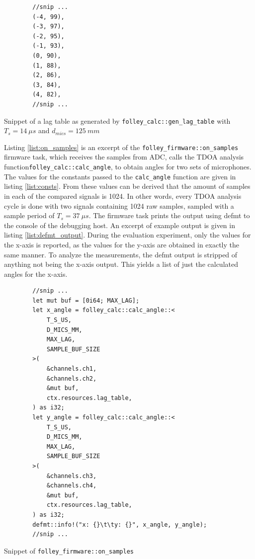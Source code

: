 \documentclass[a4paper]{article}
\newcommand{\rust}[1]{\texttt{#1}}
\begin{document}
\begin{listing}[H]
    \begin{verbatim}
        //snip ...
        (-4, 99),
        (-3, 97),
        (-2, 95),
        (-1, 93),
        (0, 90),
        (1, 88),
        (2, 86),
        (3, 84),
        (4, 82),
        //snip ...
    \end{verbatim}
    \caption{Snippet of a lag table as generated by \rust{folley_calc::gen_lag_table} with $T_s = 14\ \mu s$ and $d_{mics} = 125\ mm$}
    \label{list:lag_table}
\end{listing}

Listing \ref{list:on_samples} is an excerpt of the \rust{folley_firmware::on_samples} firmware task, which receives the samples from ADC, calls the TDOA analysis function\newline\rust{folley_calc::calc_angle}, to obtain angles for two sets of microphones. The values for the constants passed to the \rust{calc_angle} function are given in listing \ref{list:consts}. From these values can be derived that the amount of samples in each of the compared signals is 1024. In other words, every TDOA analysis cycle is done with two signals containing 1024 raw samples, sampled with a sample period of $T_s = 37\ \mu s$. The firmware task prints the output using defmt to the console of the debugging host. An excerpt of example output is given in listing \ref{list:defmt_output}. During the evaluation experiment, only the values for the x-axis is reported, as the values for the y-axis are obtained in exactly the same manner. To analyze the measurements, the defmt output is stripped of anything not being the x-axis output. This yields a list of just the calculated angles for the x-axis.

\begin{listing}[H]
    \begin{verbatim}
        //snip ...
        let mut buf = [0i64; MAX_LAG];
        let x_angle = folley_calc::calc_angle::<
            T_S_US, 
            D_MICS_MM, 
            MAX_LAG, 
            SAMPLE_BUF_SIZE
        >(
            &channels.ch1,
            &channels.ch2,
            &mut buf,
            ctx.resources.lag_table,
        ) as i32;
        let y_angle = folley_calc::calc_angle::<
            T_S_US, 
            D_MICS_MM, 
            MAX_LAG, 
            SAMPLE_BUF_SIZE
        >(
            &channels.ch3,
            &channels.ch4,
            &mut buf,
            ctx.resources.lag_table,
        ) as i32;
        defmt::info!("x: {}\t\ty: {}", x_angle, y_angle);
        //snip ...
\end{verbatim}
    \caption{Snippet of \rust{folley_firmware::on_samples}}
    \label{list:on_samples}
\end{listing}
\end{document}
